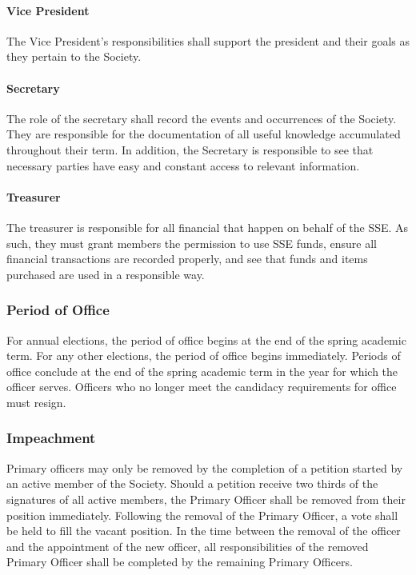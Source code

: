 \documentclass[american]{article}
\begin{document}
\paragraph{Vice President}
The Vice President's responsibilities shall support the president and their goals as they pertain to the Society.
\paragraph{Secretary}
The role of the secretary shall record the events and occurrences of the Society. They are responsible for the documentation of all useful knowledge accumulated throughout their term. In addition, the Secretary is responsible to see that necessary parties have easy and constant access to relevant information.
\paragraph{Treasurer}
The treasurer is responsible for all financial that happen on behalf of the SSE. As such, they must grant members the permission to use SSE funds, ensure all financial transactions are recorded properly, and see that funds and items purchased are used in a responsible way. 

\subsubsection{Period of Office}
For annual elections, the period of office begins at the end of the spring academic term. For any other elections, the period of office begins immediately. Periods of office conclude at the end of the spring academic term in the year for which the officer serves. Officers who no longer meet the candidacy requirements for office must resign.

\subsubsection{Impeachment}
Primary officers may only be removed by the completion of a petition started by an active member of the Society. Should a petition receive two thirds of the signatures of all active members, the Primary Officer shall be removed from their position immediately. Following the removal of the Primary Officer, a vote shall be held to fill the vacant position. In the time between the removal of the officer and the appointment of the new officer, all responsibilities of the removed Primary Officer shall be completed by the remaining Primary Officers.
\end{document}
